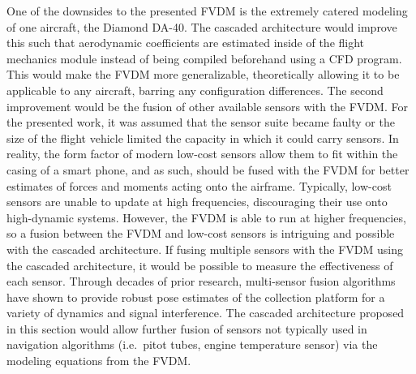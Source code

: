 One of the downsides to the presented FVDM is the extremely catered modeling of one aircraft, the Diamond DA-40. The cascaded architecture would improve this such that aerodynamic coefficients are estimated inside of the flight mechanics module instead of being compiled beforehand using a CFD program. This would make the FVDM more generalizable, theoretically allowing it to be applicable to any aircraft, barring any configuration differences. The second improvement would be the fusion of other available sensors with the FVDM\@. For the presented work, it was assumed that the sensor suite became faulty or the size of the flight vehicle limited the capacity in which it could carry sensors. In reality, the form factor of modern low-cost sensors allow them to fit within the casing of a smart phone, and as such, should be fused with the FVDM for better estimates of forces and moments acting onto the airframe. Typically, low-cost sensors are unable to update at high frequencies, discouraging their use onto high-dynamic systems. However, the FVDM is able to run at higher frequencies, so a fusion between the FVDM and low-cost sensors is intriguing and possible with the cascaded architecture. If fusing multiple sensors with the FVDM using the cascaded architecture, it would be possible to measure the effectiveness of each sensor. Through decades of prior research, multi-sensor fusion algorithms have shown to provide robust pose estimates of the collection platform for a variety of dynamics and signal interference. The cascaded architecture proposed in this section would allow further fusion of sensors not typically used in navigation algorithms (i.e.\ pitot tubes, engine temperature sensor) via the modeling equations from the FVDM\@.



